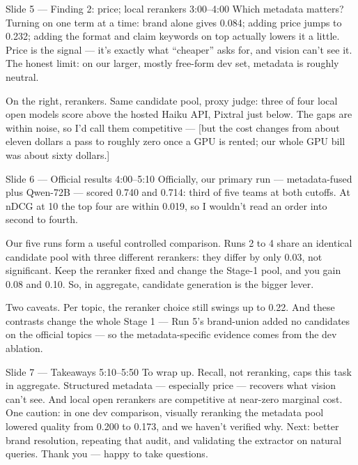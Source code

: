 \documentclass[11pt]{article}
\begin{document}
\begin{say}{Slide 5 --- Finding 2: price; local rerankers \hfill 3:00--4:00}
Which metadata matters? Turning on one term at a time: brand alone gives 0.084; adding
price jumps to 0.232; adding the format and claim keywords on top actually lowers it a
little. Price is the signal --- it's exactly what ``cheaper'' asks for, and vision can't see
it. The honest limit: on our larger, mostly free-form dev set, metadata is roughly neutral.

On the right, rerankers. Same candidate pool, proxy judge: three of four local open models
score above the hosted Haiku API, Pixtral just below. The gaps are within noise, so I'd call
them competitive --- [but the cost changes from about eleven dollars a pass to roughly zero
once a GPU is rented; our whole GPU bill was about sixty dollars.]
\end{say}

\begin{say}{Slide 6 --- Official results \hfill 4:00--5:10}
Officially, our primary run --- metadata-fused plus Qwen-72B --- scored 0.740 and 0.714:
third of five teams at both cutoffs. At nDCG at 10 the top four are within 0.019, so I
wouldn't read an order into second to fourth.

Our five runs form a useful controlled comparison. Runs 2 to 4 share an identical candidate
pool with three different rerankers: they differ by only 0.03, not significant. Keep the
reranker fixed and change the Stage-1 pool, and you gain 0.08 and 0.10. So, in aggregate,
candidate generation is the bigger lever.

Two caveats. Per topic, the reranker choice still swings up to 0.22. And these contrasts
change the whole Stage 1 --- Run 5's brand-union added no candidates on the official topics ---
so the metadata-specific evidence comes from the dev ablation.
\end{say}

\begin{say}{Slide 7 --- Takeaways \hfill 5:10--5:50}
To wrap up. Recall, not reranking, caps this task in aggregate. Structured metadata ---
especially price --- recovers what vision can't see. And local open rerankers are competitive
at near-zero marginal cost. One caution: in one dev comparison, visually reranking the metadata
pool lowered quality from 0.200 to 0.173, and we haven't verified why. Next: better brand
resolution, repeating that audit, and validating the extractor on natural queries. Thank you
--- happy to take questions.
\end{say}
\end{document}
